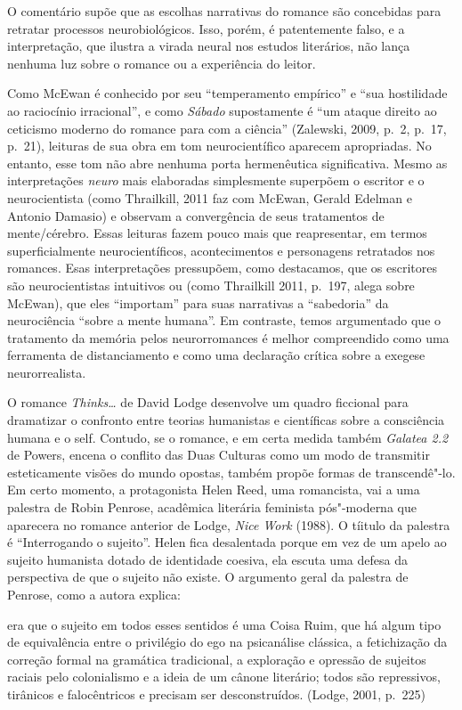 O comentário supõe que as escolhas narrativas do romance são concebidas
para retratar processos neurobiológicos. Isso, porém, é patentemente
falso, e a interpretação, que ilustra a virada neural nos estudos
literários, não lança nenhuma luz sobre o romance ou a experiência do
leitor.

Como McEwan é conhecido por seu ``temperamento empírico'' e ``sua
hostilidade ao raciocínio irracional'', e como \emph{Sábado}
supostamente é ``um ataque direito ao ceticismo moderno do romance para
com a ciência'' (Zalewski, 2009, p.~2, p.~17, p.~21), leituras de sua obra
em tom neurocientífico aparecem apropriadas. No entanto, esse tom não
abre nenhuma porta hermenêutica significativa. Mesmo as interpretações
\emph{neuro} mais elaboradas simplesmente superpõem o escritor e o
neurocientista (como Thrailkill, 2011 faz com McEwan, Gerald Edelman e
Antonio Damasio) e observam a convergência de seus tratamentos de
mente/cérebro. Essas leituras fazem pouco mais que reapresentar, em
termos superficialmente neurocientíficos, acontecimentos e personagens
retratados nos romances. Esas interpretações pressupõem, como
destacamos, que os escritores são neurocientistas intuitivos ou (como
Thrailkill 2011, p.~197, alega sobre McEwan), que eles ``importam'' para
suas narrativas a ``sabedoria'' da neurociência ``sobre a mente
humana''. Em contraste, temos argumentado que o tratamento da memória
pelos neurorromances é melhor compreendido como uma ferramenta de
distanciamento e como uma declaração crítica sobre a exegese
neurorrealista.

O romance \emph{Thinks\ldots{}} de David Lodge desenvolve um quadro ficcional
para dramatizar o confronto entre teorias humanistas e científicas sobre
a consciência humana e o self. Contudo, se o romance, e em certa medida
também \emph{Galatea 2.2} de Powers, encena o conflito das Duas Culturas
como um modo de transmitir esteticamente visões do mundo opostas, também
propõe formas de transcendê"-lo. Em certo momento, a protagonista Helen
Reed, uma romancista, vai a uma palestra de Robin Penrose, acadêmica
literária feminista pós"-moderna que aparecera no romance anterior de
Lodge, \emph{Nice Work} (1988). O tíitulo da palestra é ``Interrogando o
sujeito''. Helen fica desalentada porque em vez de um apelo ao sujeito
humanista dotado de identidade coesiva, ela escuta uma defesa da
perspectiva de que o sujeito não existe. O argumento geral da palestra
de Penrose, como a autora explica:

era que o sujeito em todos esses sentidos é uma Coisa Ruim, que há algum
tipo de equivalência entre o privilégio do ego na psicanálise clássica,
a fetichização da correção formal na gramática tradicional, a exploração
e opressão de sujeitos raciais pelo colonialismo e a ideia de um cânone
literário; todos são repressivos, tirânicos e falocêntricos e precisam
ser desconstruídos. (Lodge, 2001, p.~225)

